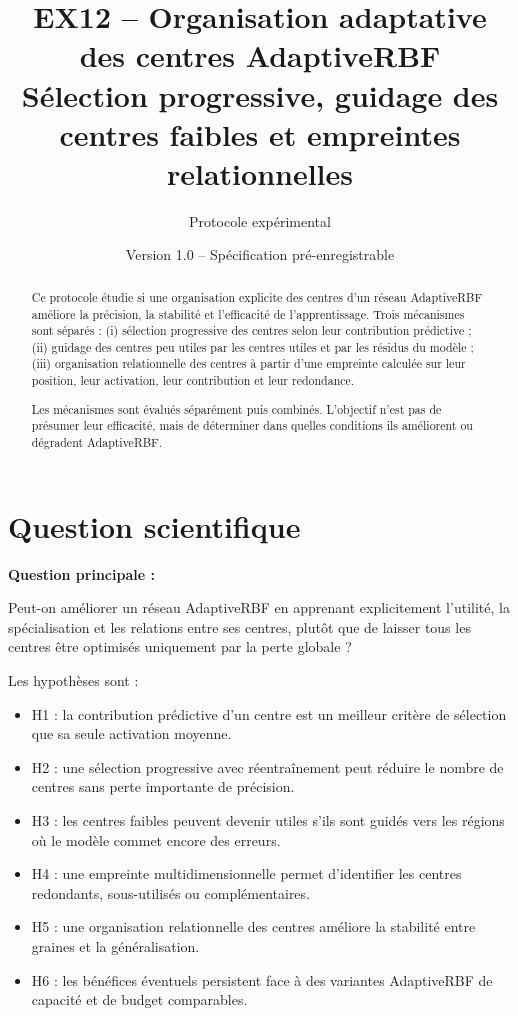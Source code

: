 \documentclass[11pt,a4paper]{article}
\title{\textbf{EX12 -- Organisation adaptative des centres AdaptiveRBF}\\
\large Sélection progressive, guidage des centres faibles et empreintes relationnelles}
\author{Protocole expérimental}
\date{Version 1.0 -- Spécification pré-enregistrable}
\begin{document}
\maketitle

\begin{abstract}
Ce protocole étudie si une organisation explicite des centres d'un réseau
AdaptiveRBF améliore la précision, la stabilité et l'efficacité de
l'apprentissage. Trois mécanismes sont séparés :
(i) sélection progressive des centres selon leur contribution prédictive ;
(ii) guidage des centres peu utiles par les centres utiles et par les
résidus du modèle ;
(iii) organisation relationnelle des centres à partir d'une empreinte
calculée sur leur position, leur activation, leur contribution et leur
redondance.

Les mécanismes sont évalués séparément puis combinés. L'objectif n'est
pas de présumer leur efficacité, mais de déterminer dans quelles conditions
ils améliorent ou dégradent AdaptiveRBF.
\end{abstract}

\tableofcontents
\newpage

\section{Question scientifique}

\textbf{Question principale :}

Peut-on améliorer un réseau AdaptiveRBF en apprenant explicitement
l'utilité, la spécialisation et les relations entre ses centres,
plutôt que de laisser tous les centres être optimisés uniquement
par la perte globale ?

Les hypothèses sont :

\begin{itemize}
  \item H1 : la contribution prédictive d'un centre est un meilleur
  critère de sélection que sa seule activation moyenne.
  \item H2 : une sélection progressive avec réentraînement peut
  réduire le nombre de centres sans perte importante de précision.
  \item H3 : les centres faibles peuvent devenir utiles s'ils sont
  guidés vers les régions où le modèle commet encore des erreurs.
  \item H4 : une empreinte multidimensionnelle permet d'identifier
  les centres redondants, sous-utilisés ou complémentaires.
  \item H5 : une organisation relationnelle des centres améliore
  la stabilité entre graines et la généralisation.
  \item H6 : les bénéfices éventuels persistent face à des variantes
  AdaptiveRBF de capacité et de budget comparables.
\end{itemize}
\end{document}
